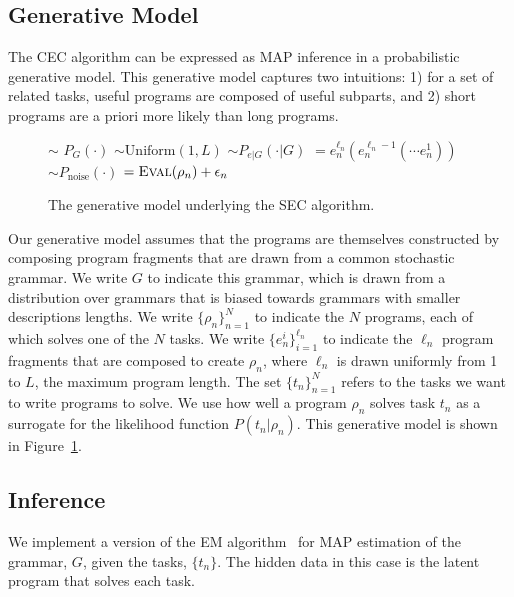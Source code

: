 \documentclass{article} %
\begin{document}
\subsection{Generative Model}
The CEC algorithm can be expressed as MAP inference in a probabilistic generative model. This generative model captures two intuitions: 1) for a set of related tasks, useful programs are composed of useful subparts, and 2) short programs are a priori more likely than long programs. 

\begin{figure}
\begin{codebox}
\li {} $\sim$ $P_G(\cdot)$ 
\li {} $\sim\mbox{Uniform}(1, L)$ 
\li {}
\li {} $\sim P_{e|G}(\cdot | G)$
\li {} $= e_n^{\ell_n} (e_n^{\ell_n-1} ( \cdots e_n^{1}))$
\li {}
\li {} $\sim P_{\mbox{noise}}(\cdot)$
\li {} $= \textsc{Eval}(\rho_n) + \epsilon_n$
\end{codebox}
\caption{The generative model underlying the SEC algorithm. \label{ref:gm}}
\end{figure}

Our generative model assumes that the programs are themselves constructed by composing program fragments that are drawn from a common stochastic grammar.
We write $G$ to indicate this grammar, which is drawn from a distribution over grammars that is biased towards grammars with smaller descriptions lengths.
We write $\{\rho_n\}_{n=1}^N$ to indicate the $N$ programs, each of which solves one of the $N$ tasks.
We write $\{e_n^i\}_{i=1}^{\ell_n}$ to indicate the $\ell_n$ program fragments that are composed to create $\rho_n$, where $\ell_n$ is drawn uniformly from 1 to $L$, the maximum program length.
The set $\{t_n\}_{n=1}^N$ refers to the tasks we want to write programs to solve.
We use how well a program $\rho_n$ solves task $t_n$ as a surrogate for the likelihood function $P(t_n | \rho_n)$.
This generative model is shown in Figure~\ref{ref:gm}.

\subsection{Inference}
We implement a version of the EM algorithm~\cite{dempster:1977} for MAP estimation of the grammar, $G$, given the tasks, $\{t_n\}$. The hidden data in this case is the latent program that solves each task.
\end{document}
